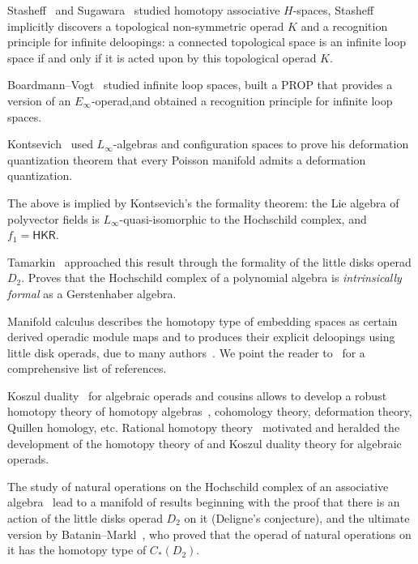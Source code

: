 \begin{tenumerate}
\item Stasheff~\cite{Stasheff1970,Stasheff1963,Stasheff1963a} and 
Sugawara~\cite{Sugawara55} studied homotopy associative $H$-spaces, Stasheff 
implicitly discovers a topological non-symmetric operad $K$ and a recognition 
principle for infinite deloopings: a connected topological space is an infinite
loop space if and only if it is acted upon by this topological operad $K$. 

\item Boardmann--Vogt~\cite{Boardman1973,bams/1183530111} studied infinite loop 
spaces, built a PROP that provides a version of an $E_\infty$-operad,and obtained
a recognition principle for infinite loop spaces.

\item Kontsevich~\cite{Kontsevich2003} used $L_\infty$-algebras and configuration 
spaces to prove his deformation quantization theorem that every Poisson manifold
admits a deformation quantization.

\item The above is implied by Kontsevich's the formality theorem: the Lie algebra 
of polyvector fields is $L_\infty$-quasi-isomorphic to the Hochschild complex, and 
$f_1 = \mathsf{HKR}$. 

\item Tamarkin~\cite{Tamarkin2003,Hinich2003} approached this result through 
the formality of the little disks operad $D_2$. Proves that the Hochschild 
complex of a polynomial algebra is \emph{intrinsically formal} as a 
Gerstenhaber algebra.

\item Manifold calculus describes the homotopy type of embedding spaces as certain 
derived operadic module maps and to produces their explicit deloopings using 
little disk operads, due to many authors~\cite{Arone2007, Goodwillie1999, Weiss1996, 
Weiss1999}. We point the reader to~\cite{IdrissiPeccot} for a comprehensive
list of references.

\item Koszul duality~\cite{Ginzburg1994} for algebraic operads and cousins allows
to develop a robust homotopy theory of homotopy algebras~\cite{Vallette2020,
Hinich1999}, cohomology theory, deformation theory, Quillen homology, etc. 
Rational homotopy theory~\cite{Quillen1967,Felix2001,Sullivan1977} motivated 
and heralded the development of the homotopy theory of and Koszul duality
theory for algebraic operads.

\item The study of natural operations on the Hochschild complex of an associative
algebra~\cite{Hochschild1945} lead to a manifold of results beginning with the 
proof that there is an action of the little disks operad $D_2$ on it (Deligne's
conjecture), and the ultimate version by Batanin--Markl~\cite{Batanin2014},
who proved that the operad of natural operations on it has the homotopy type 
of $C_*(D_2)$.  

\end{tenumerate}

